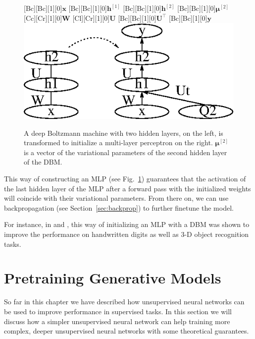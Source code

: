 \documentclass[dissertation,nocontribution,draft*]{aaltoseries}
\newcommand{\qlay}[1]{\left[#1\right]}
\newcommand{\vect}[1]{\mathbf{#1}}
\newcommand{\vects}[1]{\boldsymbol{#1}}
\newcommand{\matr}[1]{\mathbf{#1}}
\newcommand{\vh}[0]{\vect{h}}
\newcommand{\vx}[0]{\vect{x}}
\newcommand{\vy}[0]{\vect{y}}
\newcommand{\mW}[0]{\matr{W}}
\newcommand{\mU}[0]{\matr{U}}
\newcommand{\vmu}[0]{\vects{\mu}}
\begin{document}
\begin{figure}[t]
    \centering
    [Bc][Bc][1][0]{$\vx$}
    [Bc][Bc][1][0]{$\vh^{\qlay{1}}$}
    [Bc][Bc][1][0]{$\vh^{\qlay{2}}$}
    [Bc][Bc][1][0]{$\vmu^{\qlay{2}}$}
    [Cc][Cr][1][0]{$\mW$}
    [Cl][Cr][1][0]{$\mU$}
    [Bc][Bc][1][0]{$\mU^\top$}
    [Bc][Bc][1][0]{$\vy$}
    \includegraphics[width=0.75\columnwidth]{figures/dbm_mlp.eps}
    \caption{A deep Boltzmann machine with two hidden
    layers, on the left, is transformed to initialize a
    multi-layer perceptron on the right. $\vmu^{\qlay{2}}$ is a
    vector of the variational parameters of the second
    hidden layer of the DBM.}
    \label{fig:dbm_mlp}
\end{figure}

This way of constructing an MLP (see Fig.~\ref{fig:dbm_mlp})
guarantees that the activation of the last hidden layer of
the MLP after a forward pass with the initialized weights
will coincide with their variational parameters. From there
on, we can use backpropagation (see
Section~\ref{sec:backprop}) to further finetune the model.

For instance, in \citep{Salakhutdinov2009a} and
\citep{Hinton2012}, this way of initializing an MLP with a
DBM was shown to improve the performance on handwritten
digits as well as 3-D object recognition tasks.





\section{Pretraining Generative Models}
\label{sec:pretrain_gen}


So far in this chapter we have described how 
unsupervised neural networks can be used to improve 
performance in supervised tasks. In this section we will
discuss how a simpler unsupervised neural network can help
training more complex, deeper unsupervised neural networks
with some theoretical guarantees.
\end{document}
